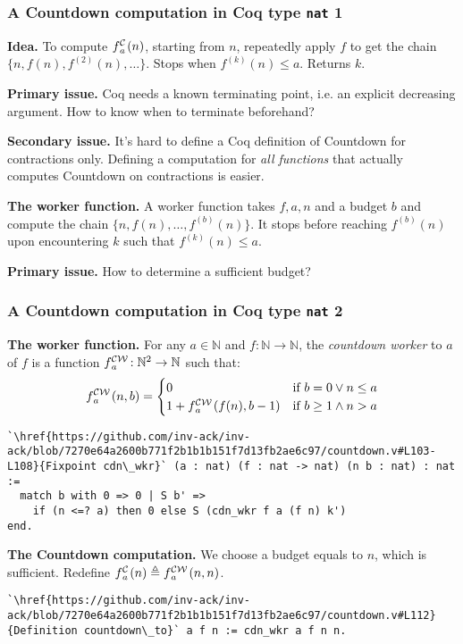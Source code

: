 \begin{frame}[fragile]
\frametitle{A Countdown computation in Coq type \texttt{nat} 1}
\textbf{Idea.} To compute $\cdt{f}{a}(n)$, starting from $n$, repeatedly apply $f$ to get the chain $\{n, f(n), f^{(2)}(n), \ldots \}$. Stops when $f^{(k)}(n)\le a$. Returns $k$.

\bigskip

\textbf{Primary issue.} Coq needs a known terminating point, i.e. an explicit decreasing argument. How to know when to terminate beforehand?

\smallskip

\textbf{Secondary issue.} It's hard to define a Coq definition of Countdown for contractions only. Defining a computation for \emph{all functions} that actually computes Countdown on contractions is easier.

\bigskip

\textbf{The worker function.} A worker function takes $f, a, n$ and a budget $b$ and compute the chain $\{n, f(n), \ldots, f^{(b)}(n)\}$. It stops before reaching $f^{(b)}(n)$ upon encountering $k$ such that $f^{(k)}(n)\le a$.

\bigskip

\textbf{Primary issue.} How to determine a sufficient budget?
\end{frame}


\begin{frame}[fragile]
\frametitle{A Countdown computation in Coq type \texttt{nat} 2}

\textbf{The worker function.} For any $a\in \mathbb{N}$ and $f: \mathbb{N}\to \mathbb{N}$, the
\emph{countdown worker}
to $a$ of $f$ is a function $\cdw{f}{a}\ : \mathbb{N}^2\to \mathbb{N}$ such that:
\begin{equation*}
\cdw{f}{a}(n, b) = \begin{cases}
0 & \text{if } b = 0 \vee n\le a \\ 1 +\cdw{f}{a}(f(n), b-1) & \text{if } b \ge 1 \wedge n > a
\end{cases}
\end{equation*}

\begin{lstlisting}
`\href{https://github.com/inv-ack/inv-ack/blob/7270e64a2600b771f2b1b1b151f7d13fb2ae6c97/countdown.v#L103-L108}{Fixpoint cdn\_wkr}` (a : nat) (f : nat -> nat) (n b : nat) : nat :=
  match b with 0 => 0 | S b' =>
    if (n <=? a) then 0 else S (cdn_wkr f a (f n) k')
end.
\end{lstlisting}

\textbf{The Countdown computation.} We choose a budget equals to $n$, which is sufficient.
Redefine $\cdt{f}{a}(n)
\triangleq \cdw{f}{a}(n, n)$.
\begin{lstlisting}
`\href{https://github.com/inv-ack/inv-ack/blob/7270e64a2600b771f2b1b1b151f7d13fb2ae6c97/countdown.v#L112}{Definition countdown\_to}` a f n := cdn_wkr a f n n.
\end{lstlisting}
\end{frame}




